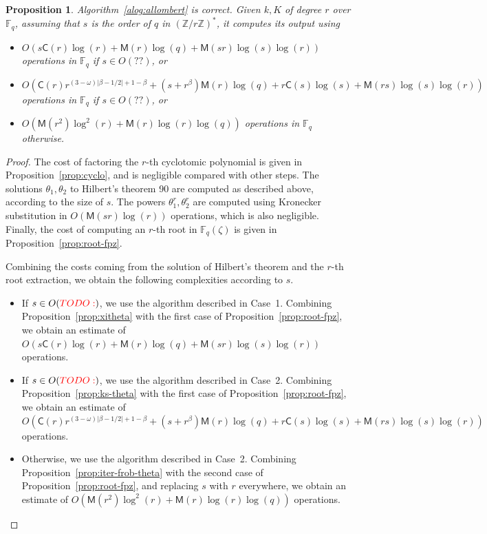 \documentclass[12pt]{article}
\theoremstyle{plain}
\newtheorem{proposition}[theorem]{Proposition}
\theoremstyle{definition}
\newcommand{\todo}[1]{\textcolor{red}{TODO: #1}}
\def\Z{\ensuremath{\mathbb{Z}}}
\def\F{\ensuremath{\mathbb{F}}}
\def\MM{\ensuremath{\mathsf{M}}}
\def\CC{\ensuremath{\mathsf{C}}}
\newcounter{algorithm}
\begin{document}
\begin{proposition}
  \label{proposition:XiDelta-updated}
  Algorithm~\ref{alog:allombert} is correct. Given $k,K$ of degree $r$
  over $\F_q$, assuming that $s$ is the order of $q$ in
  $(\Z/r\Z)^\ast$, it computes its output using
  \begin{itemize}
  \item $O(s\CC(r)\log(r)+\MM(r)\log(q)+\MM(sr)\log(s)\log(r))$
    operations in $\F_q$ if $s \in O(??)$, or
  \item
    $O(\CC(r)r^{(3-\omega)\lvert\beta-1/2\rvert+1-\beta}+(s+r^\beta)\MM(r)\log(q)+r\CC(s)\log(s)+\MM(rs)\log(s)\log(r))$
    operations in $\F_q$ if $s \in O(??)$, or
  \item $O(\MM(r^2)\log^2(r) + \MM(r)\log(r)\log(q))$ operations in
    $\F_q$ otherwise.
  \end{itemize}
\end{proposition}
\begin{proof}
  The cost of factoring the $r$-th cyclotomic polynomial is given in
  Proposition~\ref{prop:cyclo}, and is negligible compared with other
  steps. %
  The solutions $\theta_1,\theta_2$ to Hilbert's theorem 90 are
  computed as described above, according to the size of $s$. %
  The powers $\theta_1^r,\theta_2^r$ are computed using Kronecker
  substitution in $O(\MM(sr)\log(r))$ operations, which is also
  negligible. %
  Finally, the cost of computing an $r$-th root in $\F_q(\zeta)$ is
  given in Proposition~\ref{prop:root-fpz}. %

  Combining the costs coming from the solution of Hilbert's theorem
  and the $r$-th root extraction, we obtain the following complexities
  according to $s$.
  \begin{itemize}
  \item If $s\in O(\todo{})$, we use the algorithm described in
    Case~1. Combining Proposition~\ref{prop:xitheta} with the first
    case of Proposition~\ref{prop:root-fpz}, we obtain an estimate of
    $O(s\CC(r)\log(r)+\MM(r)\log(q)+\MM(sr)\log(s)\log(r))$
    operations.
  \item If $s\in O(\todo{})$, we use the algorithm described in
    Case~2. Combining Proposition~\ref{prop:ks-theta} with the first
    case of Proposition~\ref{prop:root-fpz}, we obtain an estimate of
    $O(\CC(r)r^{(3-\omega)\lvert\beta-1/2\rvert+1-\beta}+(s+r^\beta)\MM(r)\log(q)+r\CC(s)\log(s)+\MM(rs)\log(s)\log(r))$
    operations.
  \item Otherwise, we use the algorithm described in Case~2. Combining
    Proposition~\ref{prop:iter-frob-theta} with the second case of
    Proposition~\ref{prop:root-fpz}, and replacing $s$ with $r$
    everywhere, we obtain an estimate of
    $O(\MM(r^2)\log^2(r) + \MM(r)\log(r)\log(q)) $ operations.
  \end{itemize}
\end{proof}
\end{document}
